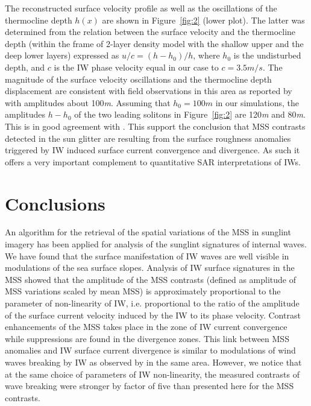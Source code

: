 \documentclass{report}
\begin{document}
The reconstructed surface velocity profile as well as the oscillations of the thermocline depth $h(x)$ are shown in Figure~\ref{fig:2} (lower plot). The latter was determined from the relation between the surface velocity and the thermocline depth (within the frame of 2-layer density model with the shallow upper and the deep lower layers) expressed as $u/c = \left( h-h_0 \right) / h $, where $h_0$ is the undisturbed depth, and $c$ is the IW phase velocity equal in our case to $c=3.5m/s$. The magnitude of the surface velocity oscillations and the thermocline depth displacement are consistent with field observations in this area as reported by \cite{Dulov1986} with amplitudes about 100\textit{m}. Assuming that $h_0 = 100m$ in our simulations, the amplitudes $h-h_0$ of the two leading solitons in Figure~\ref{fig:2} are 120\textit{m} and 80\textit{m}. This is in good agreement with \citep{Dulov1986}. This support the conclusion that MSS contrasts detected in the sun glitter are resulting from the surface roughness anomalies triggered by IW induced surface current convergence and divergence. As such it offers a very important complement to quantitative SAR interpretations of IWs.


\section{Conclusions}

An algorithm for the retrieval of the spatial variations of the MSS in sunglint imagery has been applied for analysis of the sunglint signatures of internal waves. We have found that the surface manifestation of IW waves are well visible in modulations of the sea surface slopes. Analysis of IW surface signatures in the MSS showed that the amplitude of the MSS contrasts (defined as amplitude of MSS variations scaled by mean MSS) is approximately proportional to the parameter of non-linearity of IW, i.e. proportional to the ratio of the amplitude of the surface current velocity induced by the IW to its phase velocity. Contrast enhancements of the MSS takes place in the zone of IW current convergence while suppressions are found in the divergence zones. This link between MSS anomalies and IW surface current divergence is similar to modulations of wind waves breaking by IW as observed by \cite{Dulov1986} in the same area. However, we notice that at the same choice of parameters of IW non-linearity, the measured contrasts of wave breaking were stronger by factor of five than presented here for the MSS contrasts.
\end{document}
